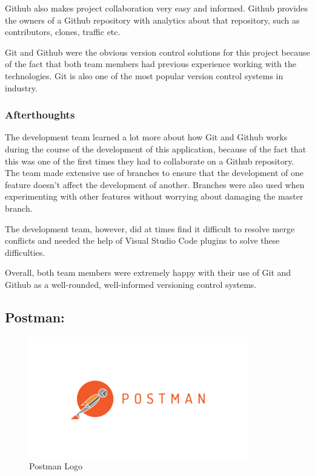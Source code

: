 Github also makes project collaboration very easy and informed. Github provides the owners of a Github repository with analytics about that repository, such as contributors, clones, traffic etc. 

\bigskip

Git and Github were the obvious version control solutions for this project because of the fact that both team members had previous experience working with the technologies. Git is also one of the most popular version control systems in industry. 

\subsubsection{Afterthoughts}

The development team learned a lot more about how Git and Github works during the course of the development of this application, because of the fact that this was one of the first times they had to collaborate on a Github repository. The team made extensive use of branches to ensure that the development of one feature doesn't affect the development of another. Branches were also used when experimenting with other features without worrying about damaging the master branch. 

The development team, however, did at times find it difficult to resolve merge conflicts and needed the help of Visual Studio Code plugins to solve these difficulties.

\bigskip
Overall, both team members were extremely happy with their use of Git and Github as a well-rounded, well-informed versioning control systems. 



\subsection{Postman:}
\label{sec:TechnologyReviewPostman}

\begin{figure}[H]
    \centering
    \includegraphics[width=\textwidth, height=150pt]{img/PostManLogo.PNG}
    \caption{Postman Logo}
    \label{fig:my_label}
\end{figure}

